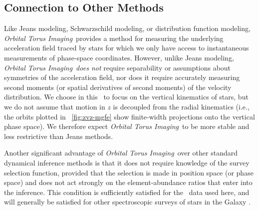 \documentclass[modern]{aastex63}
\newcommand{\methodname}{\textsl{Orbital Torus Imaging}}
\newcommand{\apogee}{\acronym{APOGEE}}
\begin{document}
\subsection{Connection to Other Methods}


Like Jeans modeling, Schwarzschild modeling, or distribution function modeling,
\methodname\ provides a method for measuring the underlying acceleration field
traced by stars for which we only have access to instantaneous measurements of
phase-space coordinates.
However, unlike Jeans modeling, \methodname\ \emph{does not} require
separability or assumptions about symmetries of the acceleration field, nor does
it require accurately measuring second moments (or spatial derivatives of second
moments) of the velocity distribution.
We choose in this \documentname\ to focus on the vertical kinematics of stars,
but we do not assume that motion in $z$ is decoupled from the radial kinematics
(i.e., the orbits plotted in \figurename~\ref{fig:zvz-mgfe} show finite-width
projections onto the vertical phase space).
We therefore expect \methodname\ to be more stable and less restrictive than
Jeans methods.

Another significant advantage of \methodname\ over other standard dynamical
inference methods is that it does not require knowledge of the survey selection
function, provided that the selection is made in position space (or phase space)
and does not act strongly on the element-abundance ratios that enter into the
inference.
This condition is sufficiently satisfied for the \apogee\ data used here, and
will generally be satisfied for other spectroscopic surveys of stars in the
Galaxy \citep[e.g., ;][]{Martell:2017, Buder:2018}.
\end{document}
